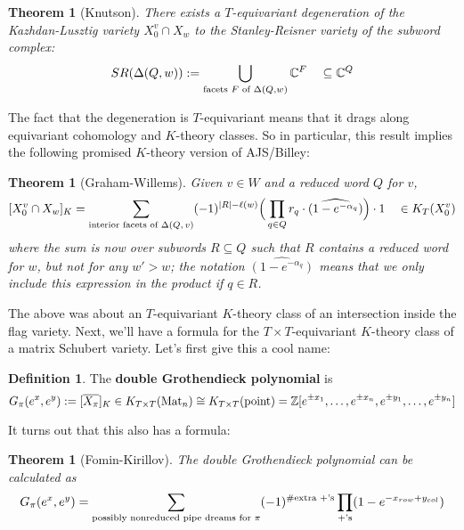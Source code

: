 \documentclass[12pt]{amsart}
\numberwithin{equation}{section}
\newtheorem{Theorem}[equation]{Theorem}
\theoremstyle{definition}
\newtheorem{Definition}[equation]{Definition}
\numberwithin{figure}{section}
\begin{document}
\begin{Theorem}[Knutson] There exists a $T$-equivariant degeneration of the Kazhdan-Lusztig variety $X_0^v \cap X_w$ to the Stanley-Reisner variety of the subword complex:
\[ SR(\Delta(Q,w)) := \bigcup_{\textup{facets $F$ of }\Delta(Q,w)} \mathbb{C}^F \quad \subseteq \mathbb{C}^Q\]
\end{Theorem}

The fact that the degeneration is $T$-equivariant means that it drags along equivariant cohomology and $K$-theory classes. So in particular, this result implies the following promised $K$-theory version of AJS/Billey:
\begin{Theorem}[Graham-Willems]
Given $v\in W$ and a reduced word $Q$ for $v$,
\[ [ X_0^v \cap X_w]_K = \sum_{\textup{interior facets of $\Delta(Q,v)$}} (-1)^{|R|-\ell(w)}\Big(\prod_{q\in Q}r_q\cdot  \widehat{(1-e^{-\alpha_q})}\Big)\cdot 1 \quad \in K_T(X_0^v)\]
where the sum is now over subwords $R\subseteq Q$ such that $R$ contains a reduced word for $w$, but not for any $w' > w$; the notation $\widehat{(1-e^{-\alpha_q})}$ means that we only include this expression in the product if $q\in R$. 
\end{Theorem}

The above was about an $T$-equivariant $K$-theory class of an intersection inside the flag variety. Next, we'll have a formula for the $T\times T$-equivariant $K$-theory class of a matrix Schubert variety. Let's first give this a cool name:

\begin{Definition}
The \textbf{double Grothendieck polynomial} is 
\[ G_\pi(e^x, e^y) := [ \overline{X_\pi}]_K \in K_{T\times T}(\textup{Mat}_n) \cong K_{T\times T}(\textup{point}) = \mathbb{Z}[e^{\pm x_1}, \dots, e^{\pm x_n}, e^{\pm y_1}, \dots, e^{\pm y_n}]\]
\end{Definition}

\noindent It turns out that this also has a formula:

\begin{Theorem}[Fomin-Kirillov]
The double Grothendieck polynomial can be calculated as
\[G_\pi(e^x,e^y) = \sum_{\textup{possibly nonreduced pipe dreams for $\pi$}} (-1)^{\# \textup{extra $+$'s}} \prod_{+\textup{'s}} (1-e^{-x_{row} + y_{col}})\]
\end{Theorem}
\end{document}
